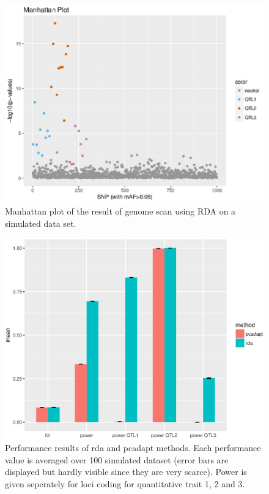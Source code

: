 \documentclass[nogrid]{MBE}%
\begin{document}
\begin{figure}[t]
\begin{center}
\includegraphics[height=0.21\textheight]{figures/sim5_capscale.eps}
\end{center}
\caption{Manhattan plot of the result of genome scan using RDA on a simulated data set.}%
\label{fig:rda}%
\end{figure}


\begin{figure}[t]
\begin{center}
\includegraphics[height=0.4\textheight]{figures/overallresults.eps}
\end{center}
\caption{Performance results of rda and pcadapt methods. Each performance value is averaged over 100 simulated dataset (error bars are displayed but hardly visible since they are very scarce). Power is given seperately for loci coding for quantitative trait 1, 2 and 3.}%
\label{fig:performance}%
\end{figure}
\end{document}
